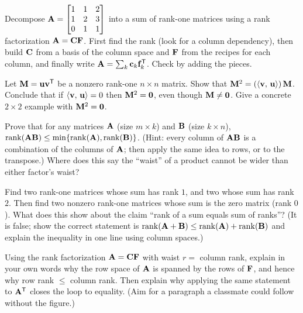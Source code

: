 \begin{exercise}\label{ch16:ex-sum}
Decompose $\mathbf{A}=\begin{bmatrix} 1 & 1 & 2 \\ 1 & 2 & 3 \\ 0 & 1 & 1 \end{bmatrix}$
into a sum of rank-one matrices using a rank factorization $\mathbf{A}=\mathbf{C}\mathbf{F}$.
First find the rank (look for a column dependency), then build $\mathbf{C}$ from a
basis of the column space and $\mathbf{F}$ from the recipes for each column, and
finally write $\mathbf{A}=\sum_k \mathbf{c}_k\mathbf{f}_k^{\mathsf{T}}$. Check by adding the pieces.
\end{exercise}

\begin{exercise}\label{ch16:ex-rankone-property}
Let $\mathbf{M}=\mathbf{u}\mathbf{v}^{\mathsf{T}}$ be a nonzero rank-one $n\times n$ matrix. Show that
$\mathbf{M}^2 = (\langle \mathbf{v},\, \mathbf{u} \rangle)\,\mathbf{M}$. Conclude that if
$\langle \mathbf{v},\, \mathbf{u} \rangle=0$ then $\mathbf{M}^2 = \mathbf{0}$, even though
$\mathbf{M}\ne\mathbf{0}$. Give a concrete $2\times 2$ example with $\mathbf{M}^2=\mathbf{0}$.
\end{exercise}

\begin{exercise}\label{ch16:ex-rank-bound}
Prove that for any matrices $\mathbf{A}$ (size $m\times k$) and $\mathbf{B}$ (size
$k\times n$), $\operatorname{rank}(\mathbf{A}\mathbf{B}) \le \min\{\operatorname{rank}(\mathbf{A}),\operatorname{rank}(\mathbf{B})\}$.
(Hint: every column of $\mathbf{A}\mathbf{B}$ is a combination of the columns of
$\mathbf{A}$; then apply the same idea to rows, or to the transpose.) Where does this
say the ``waist'' of a product cannot be wider than either factor's waist?
\end{exercise}

\begin{exercise}\label{ch16:ex-rankone-sum-trap}
Find two rank-one matrices whose sum has rank $1$, and two whose sum has rank $2$.
Then find two nonzero rank-one matrices whose sum is the zero matrix (rank $0$).
What does this show about the claim ``rank of a sum equals sum of ranks''? (It is
false; show the correct statement is $\operatorname{rank}(\mathbf{A}+\mathbf{B})\le
\operatorname{rank}(\mathbf{A})+\operatorname{rank}(\mathbf{B})$ and explain the inequality in one line using column
spaces.)
\end{exercise}

\begin{exercise}\label{ch16:ex-rowcol-proof}
Using the rank factorization $\mathbf{A}=\mathbf{C}\mathbf{F}$ with waist $r=$ column rank,
explain in your own words why the row space of $\mathbf{A}$ is spanned by the rows of
$\mathbf{F}$, and hence why row rank $\le$ column rank. Then explain why applying the
same statement to $\mathbf{A}^{\mathsf{T}}$ closes the loop to equality. (Aim for a paragraph a
classmate could follow without the figure.)
\end{exercise}

